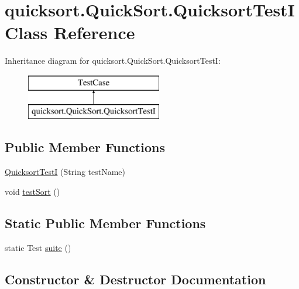 \hypertarget{classquicksort_1_1_quick_sort_1_1_quicksort_test_i}{}\section{quicksort.\+Quick\+Sort.\+Quicksort\+TestI Class Reference}
\label{classquicksort_1_1_quick_sort_1_1_quicksort_test_i}
Inheritance diagram for quicksort.\+Quick\+Sort.\+Quicksort\+TestI\+:\begin{figure}[H]
\begin{center}
\leavevmode
\includegraphics[height=2.000000cm]{classquicksort_1_1_quick_sort_1_1_quicksort_test_i}
\end{center}
\end{figure}
\subsection*{Public Member Functions}
\begin{DoxyCompactItemize}
\item 
\hyperlink{classquicksort_1_1_quick_sort_1_1_quicksort_test_i_a5593ed30c027d8960b4b7a09fa7c2b0b}{Quicksort\+TestI} (String test\+Name)
\item 
void \hyperlink{classquicksort_1_1_quick_sort_1_1_quicksort_test_i_ae59d12ab37b2b52a18cec8a181080220}{test\+Sort} ()
\end{DoxyCompactItemize}
\subsection*{Static Public Member Functions}
\begin{DoxyCompactItemize}
\item 
static Test \hyperlink{classquicksort_1_1_quick_sort_1_1_quicksort_test_i_a6df0165d435083a8a99518679e0b9b7c}{suite} ()
\end{DoxyCompactItemize}


\subsection{Constructor \& Destructor Documentation}
\hypertarget{classquicksort_1_1_quick_sort_1_1_quicksort_test_i_a5593ed30c027d8960b4b7a09fa7c2b0b}{}\label{classquicksort_1_1_quick_sort_1_1_quicksort_test_i_a5593ed30c027d8960b4b7a09fa7c2b0b} 
